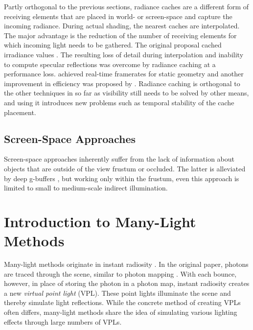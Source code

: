 Partly orthogonal to the previous sections, radiance caches are a different form of receiving elements that are placed in world- or screen-space and capture the incoming radiance. During actual shading, the nearest caches are interpolated. The major advantage is the reduction of the number of receiving elements for which incoming light needs to be gathered.
The original proposal cached irradiance values \citep{Ward:1988:IrradianceCaching}. The resulting loss of detail during interpolation and inability to compute specular reflections was overcome by radiance caching \citep{Krivanek:2005:RadianceCaching} at a performance loss. \citet{Scherzer:2012:PreconvolvedRadianceCaching} achieved real-time framerates for static geometry and another improvement in efficiency was proposed by \citet{Rehfeld:2014:ClusteredPreconvolvedRadianceCaching}.
Radiance caching is orthogonal to the other techniques in so far as visibility still needs to be solved by other means, and using it introduces new problems such as temporal stability of the cache placement.


\subsection{Screen-Space Approaches}

Screen-space approaches inherently suffer from the lack of information about objects that are outside of the view frustum or occluded. The latter is alleviated by deep g-buffers \citep{Mara:2014:DeepGBuffers, Mara:2016:DeepGBuffers2}, but working only within the frustum, even this approach is limited to small to medium-scale indirect illumination.



\section{Introduction to Many-Light Methods}


Many-light methods originate in instant radiosity \citep{Keller:1997:InstantRadiosity}. In the original paper, photons are traced through the scene, similar to photon mapping \citep{Jensen:1996:PhotonMapping}. With each bounce, however, in place of storing the photon in a photon map, instant radiosity creates a new \emph{virtual point light} (VPL). These point lights illuminate the scene and thereby simulate light reflections. While the concrete method of creating VPLs often differs, many-light methods share the idea of simulating various lighting effects through large numbers of VPLs.


